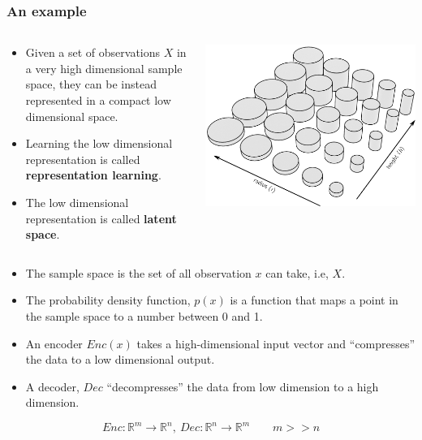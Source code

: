 \documentclass{beamer}
\begin{document}
\begin{frame}
\frametitle{An example}
\begin{columns}
	\begin{column}{.5\linewidth}
		\begin{itemize}
			\item Given a set of observations $X$ in a very high dimensional
			sample space, they can be instead represented in a compact
			low dimensional space.
			\item Learning the low dimensional representation is called
			\textbf{representation learning}.
			\item The low dimensional representation is called \textbf{latent space}.
		\end{itemize}
	\end{column}
	\begin{column}{.5\linewidth}
		\includegraphics[width=\linewidth]{./example.png}
	\end{column}
\end{columns}
\end{frame}

\begin{frame}
\begin{definition}
	\begin{itemize}
		\item The sample space is the set of all observation $x$ can take,
		i.e, $X$.
		\item The probability density function, $p(x)$ is a function that
		maps a point in the sample space to a number between 0 and 1.
		\item An encoder $Enc(x)$ takes a high-dimensional input vector
		and ``compresses'' the data to a low dimensional output.
		\item A decoder, $Dec$ ``decompresses'' the data from low dimension to
		a high dimension.
	\end{itemize}
\end{definition}
\begin{equation}
	Enc:\mathbb{R}^m\to\mathbb{R}^n,\ Dec:\mathbb{R}^n\to\mathbb{R}^m\qquad m>>n
\end{equation}
\end{frame}
\end{document}
